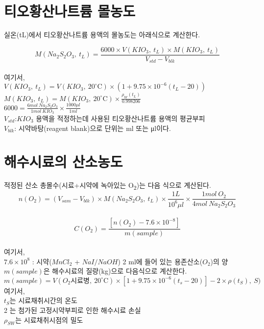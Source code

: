 \documentclass[
]{book}
\begin{document}
\hypertarget{uxd2f0uxc624uxd669uxc0b0uxb098uxd2b8uxb968-uxbab0uxb18duxb3c4}{%
\section{티오황산나트륨 몰농도}\label{uxd2f0uxc624uxd669uxc0b0uxb098uxd2b8uxb968-uxbab0uxb18duxb3c4}}

실온(tL)에서 티오황산나트륨 용액의 몰농도는 아래식으로 계산한다.

\[M(Na_{2}S_{2}O_{3}, ~ t_{L})= \frac{6000 \times V(KIO_{3}, ~ t_{L}) \times M(KIO_{3}, ~ t_{L})}{V_{std} - V_{blk}}\]\\
여기서,\\
\(V(KIO_{3}, ~ t_{L}) = V(KIO_{3}, ~ 20^{\circ} \mathrm C) \times (1+9.75 \times 10^{-6} (t_{L} -20))\)\\
\(M(KIO_{3}, ~ t_{L}) = M(KIO_{3}, ~ 20^{\circ} \mathrm C) \times \frac{\rho_{W} (t_{L})}{0.998206}\)\\
\(6000 = \frac{6mol~Na_{2}S_{2}O_{3}}{1mol~ KIO_{3}} \times \frac{1000 \mu l}{1ml}\)\\
\(V_{std}\):\(KIO_3\) 용액을 적정하는데 사용된 티오황산나트륨 용액의 평균부피\\
\(V_{blk}\): 시약바탕(reagent blank)으로 단위는 ml 또는 μl이다.

\hypertarget{uxd574uxc218uxc2dcuxb8ccuxc758-uxc0b0uxc18cuxb18duxb3c4}{%
\section{해수시료의 산소농도}\label{uxd574uxc218uxc2dcuxb8ccuxc758-uxc0b0uxc18cuxb18duxb3c4}}

적정된 산소 총몰수(시료+시약에 녹아있는 O\textsubscript{2})는 다음 식으로 계산된다.\\
\[n(O_{2})=(V_{sam}-V_{blk}) \times M(Na_{2}S_{2}O_{3}, ~ t_{L}) \times \frac{1L}{10^{6} \mu l} \times \frac{1 mol ~ O_2}{4 mol ~ Na_{2}S_{2} O_{3}}\]\\
\[C(O_2)= \frac {[n(O_2)-7.6 \times 10^{-8}]}{m(sample)}\]\\
여기서,\\
\(7.6×10^{8}\) : 시약(\(MnCl_2\) + \(NaI/NaOH\)) 2 ml에 들어 있는 용존산소(\(O_2\))의 양\\
\(m(sample)\)은 해수시료의 질량(kg)으로 다음식으로 계산한다.\\
\(m(sample)=V(O_{2} 시료병, ~ 20^{\circ} \mathrm C) \times [1 + 9.75 \times 10^{-6} (t_s - 20)]-2 \times \rho (t_S), ~ S)\)\\
여기서,\\
\(t_S\)는 시료채취시간의 온도\\
2 는 첨가된 고정시약부피로 인한 해수시료 손실\\
\(\rho_{SW}\)는 시료채취시점의 밀도
\end{document}
